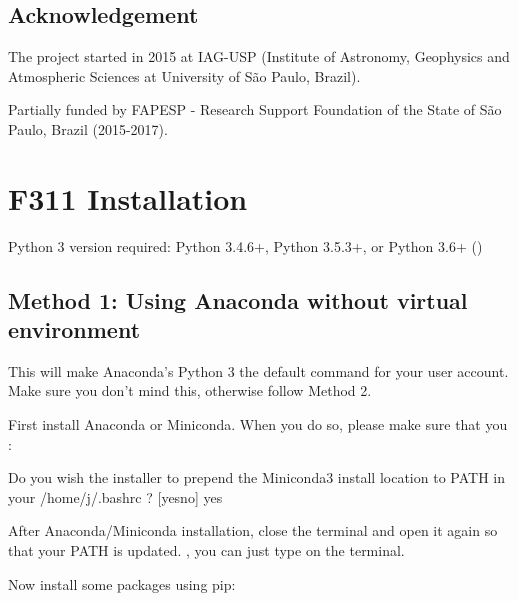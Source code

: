 \documentclass[letterpaper,10pt,english]{sphinxmanual}
\begin{document}
\section{Acknowledgement}
\label{\detokenize{intro:acknowledgement}}
The project started in 2015 at IAG-USP (Institute of Astronomy, Geophysics and Atmospheric Sciences
at University of São Paulo, Brazil).

Partially funded by FAPESP - Research Support Foundation of the State of São Paulo, Brazil (2015-2017).


\chapter{F311 Installation}
\label{\detokenize{install::doc}}\label{\detokenize{install:f311-installation}}
Python 3 version required: Python 3.4.6+, Python 3.5.3+, or Python 3.6+ ()


\section{Method 1: Using Anaconda without virtual environment}
\label{\detokenize{install:method-1-using-anaconda-without-virtual-environment}}
This will make Anaconda’s Python 3 the default  command for your user account.
Make sure you don’t mind this, otherwise follow Method 2.

First install Anaconda or Miniconda. When you do so, please make sure that you :

\begin{sphinxVerbatim}[commandchars=\\\{\}]
Do you wish the installer to prepend the Miniconda3 install location
to PATH in your /home/j/.bashrc ? [yes\textbar{}no]
\PYGZgt{}\PYGZgt{} yes
\end{sphinxVerbatim}

After Anaconda/Miniconda installation, close the terminal and open it again so that your PATH is updated.
, you can just type  on the terminal.

Now install some packages using pip:

\begin{sphinxVerbatim}[commandchars=\\\{\}]
               
\end{sphinxVerbatim}
\end{document}
